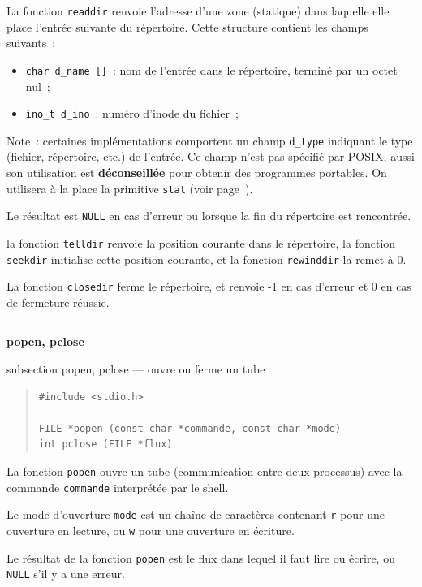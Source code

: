 \documentclass [twoside] {report}
\newcommand {\primitive} [1]
    {
	\phantomsection
	{\large \textbf {#1}}
	\addcontentsline {toc} {subsection} {#1}
    }
\newcommand {\separation}
    {
	\vspace {5mm}
	\nopagebreak
	\hrule
    }
\begin{document}
La fonction \texttt {readdir} renvoie l'adresse d'une zone (statique) dans
laquelle elle place l'entrée suivante du répertoire. Cette structure
contient les champs suivants~:

\begin {itemize}
    \item \texttt {char d\_name []}~: nom de l'entrée dans le
	répertoire, terminé par un octet nul~;
    \item \texttt {ino\_t d\_ino}~: numéro d'inode du fichier~;
\end {itemize}

Note~: certaines implémentations comportent un champ \texttt {d\_type}
indiquant le type (fichier, répertoire, etc.) de l'entrée. Ce champ
n'est pas spécifié par POSIX, aussi son utilisation est \textbf
{déconseillée} pour obtenir des programmes portables. On utilisera à
la place la primitive \texttt {stat} (voir page~\pageref {stat}).

Le résultat est \texttt {NULL} en cas d'erreur ou lorsque la fin du
répertoire est rencontrée.

la fonction \texttt {telldir} renvoie la position courante dans le
répertoire, la fonction \texttt {seekdir} initialise cette position
courante, et la fonction \texttt {rewinddir} la remet à 0.

La fonction \texttt {closedir} ferme le répertoire, et renvoie -1 en cas
d'erreur et 0 en cas de fermeture réussie.


\separation
\primitive {popen, pclose} --- ouvre ou ferme un tube

\begin {quote}
\begin {verbatim}
#include <stdio.h>

FILE *popen (const char *commande, const char *mode)
int pclose (FILE *flux)
\end{verbatim}
\end {quote}

La fonction \texttt {popen} ouvre un tube (communication entre
deux processus) avec la commande \texttt {commande} interprétée par
le shell.

Le mode d'ouverture \texttt {mode} est un chaîne de caractères
contenant \texttt {r} pour une ouverture en lecture, ou \texttt {w} pour
une ouverture en écriture.

Le résultat de la fonction \texttt {popen} est le flux dans lequel
il faut lire ou écrire, ou \texttt {NULL} s'il y a une erreur.
\end{document}
